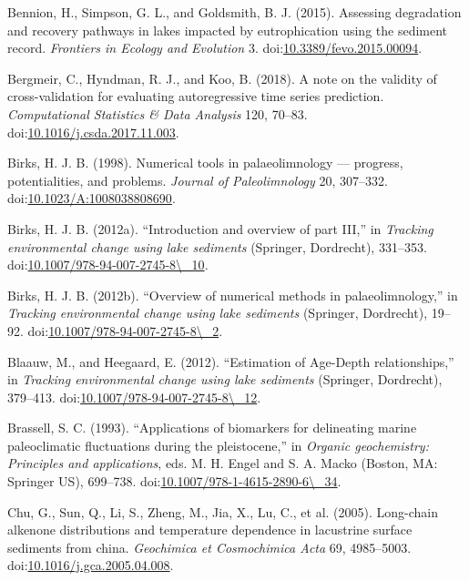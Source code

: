 \documentclass[12pt,]{article}
\begin{document}
\hypertarget{ref-Bennion2015-ph}{}
Bennion, H., Simpson, G. L., and Goldsmith, B. J. (2015). Assessing
degradation and recovery pathways in lakes impacted by eutrophication
using the sediment record. \emph{Frontiers in Ecology and Evolution} 3.
doi:\href{https://doi.org/10.3389/fevo.2015.00094}{10.3389/fevo.2015.00094}.

\hypertarget{ref-Bergmeir2018-pu}{}
Bergmeir, C., Hyndman, R. J., and Koo, B. (2018). A note on the validity
of cross-validation for evaluating autoregressive time series
prediction. \emph{Computational Statistics \& Data Analysis} 120,
70--83.
doi:\href{https://doi.org/10.1016/j.csda.2017.11.003}{10.1016/j.csda.2017.11.003}.

\hypertarget{ref-Birks1998-po}{}
Birks, H. J. B. (1998). Numerical tools in palaeolimnology --- progress,
potentialities, and problems. \emph{Journal of Paleolimnology} 20,
307--332.
doi:\href{https://doi.org/10.1023/A:1008038808690}{10.1023/A:1008038808690}.

\hypertarget{ref-Birks2012-op}{}
Birks, H. J. B. (2012a). ``Introduction and overview of part III,'' in
\emph{Tracking environmental change using lake sediments} (Springer,
Dordrecht), 331--353.
doi:\href{https://doi.org/10.1007/978-94-007-2745-8/_10}{10.1007/978-94-007-2745-8\textbackslash{}\_10}.

\hypertarget{ref-Birks2012-fa}{}
Birks, H. J. B. (2012b). ``Overview of numerical methods in
palaeolimnology,'' in \emph{Tracking environmental change using lake
sediments} (Springer, Dordrecht), 19--92.
doi:\href{https://doi.org/10.1007/978-94-007-2745-8/_2}{10.1007/978-94-007-2745-8\textbackslash{}\_2}.

\hypertarget{ref-Blaauw2012-yq}{}
Blaauw, M., and Heegaard, E. (2012). ``Estimation of Age-Depth
relationships,'' in \emph{Tracking environmental change using lake
sediments} (Springer, Dordrecht), 379--413.
doi:\href{https://doi.org/10.1007/978-94-007-2745-8/_12}{10.1007/978-94-007-2745-8\textbackslash{}\_12}.

\hypertarget{ref-Brassell1993-fw}{}
Brassell, S. C. (1993). ``Applications of biomarkers for delineating
marine paleoclimatic fluctuations during the pleistocene,'' in
\emph{Organic geochemistry: Principles and applications}, eds. M. H.
Engel and S. A. Macko (Boston, MA: Springer US), 699--738.
doi:\href{https://doi.org/10.1007/978-1-4615-2890-6/_34}{10.1007/978-1-4615-2890-6\textbackslash{}\_34}.

\hypertarget{ref-Chu2005-es}{}
Chu, G., Sun, Q., Li, S., Zheng, M., Jia, X., Lu, C., et al. (2005).
Long-chain alkenone distributions and temperature dependence in
lacustrine surface sediments from china. \emph{Geochimica et
Cosmochimica Acta} 69, 4985--5003.
doi:\href{https://doi.org/10.1016/j.gca.2005.04.008}{10.1016/j.gca.2005.04.008}.
\end{document}
